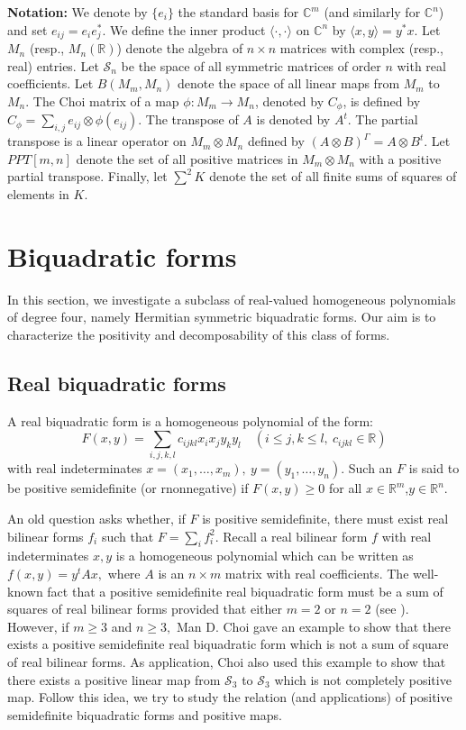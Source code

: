 \documentclass[12pt,a4paper]{amsart}
\theoremstyle{plain}
\theoremstyle{remark}
\theoremstyle{definition}
\def \R {\mathbb{R}}
\def \C {\mathbb{C}}
\def \cS {\mathcal{S}}
\begin{document}
\textbf{Notation:} We denote by $\{e_i\}$ the standard basis for $\C^m$ (and similarly for $\C^n$) and set $e_{ij} = e_i e_j^*$. We define the inner product $\langle \cdot , \cdot \rangle$ on $\C^n$ by $\langle x,y\rangle = y^*x$. Let $M_n$ (resp., $M_n(\R)$) denote the algebra of $n\times n$ matrices with complex (resp., real) entries. Let $\cS_n$ be the space of all symmetric matrices of order $n$ with real coefficients. Let $B(M_m, M_n)$ denote the space of all linear maps from $M_m$ to $M_n$. The Choi matrix of a map $\phi: M_m \to M_n$, denoted by $C_{\phi}$, is defined by $C_{\phi} = \sum_{i,j}e_{ij} \otimes \phi(e_{ij})$. The transpose of $A$ is denoted by $A^t$. The partial transpose is a linear operator on $M_m\otimes M_n$ defined by $(A \otimes B)^{\Gamma} = A \otimes B^t$. Let $PPT[m,n]$ denote the set of all positive matrices in $M_m\otimes M_n$ with a positive partial transpose. Finally, let $\sum^2 K$ denote the set of all finite sums of squares of elements in $K$.
\section{Biquadratic forms}
In this section, we investigate a subclass of real-valued homogeneous polynomials of degree four, namely Hermitian symmetric biquadratic forms. Our aim is to characterize the positivity and decomposability of this class of forms.

\subsection{Real biquadratic forms}
A real biquadratic form is a homogeneous polynomial of the form:
$$
F(x,y) = \sum_{i,j,k,l} c_{ijkl} x_ix_jy_ky_l \quad  (i \le j, k\le l, \ c_{ijkl} \in \R) 
$$
with real indeterminates $x=(x_1,\ldots, x_m), \ y = ( y_1, \ldots, y_n).$ Such an $F$ is said to be positive semidefinite (or rnonnegative) if $F(x,y) \ge 0$ for all $x\in \R^m$,$y\in \R^n.$ 

An old question asks whether, if $F$ is positive semidefinite, there must exist real bilinear forms $f_i$ such that $F = \sum_{i} f_i^2$. Recall a real bilinear form $f$ with real indeterminates $x,y$ is a homogeneous polynomial which can be written as $f(x,y) = y^tAx,$ where $A$ is an $n\times m$ matrix with real coefficients.
The well-known fact that a positive semidefinite real biquadratic form must be a sum of squares of real bilinear forms provided that either $m=2$ or $n=2$ (see \cite[Theorem 1]{Calderon}). However, if $m\ge 3$ and $n\ge 3,$ Man D. Choi \cite{Choi75a} gave an example to show that there exists a positive semidefinite real biquadratic form which is not a sum of square of real bilinear forms.
As application, Choi also used this example to show that there exists a positive linear map from $\cS_3$ to $\cS_3$ which is not completely positive map. Follow this idea, we try to study the relation (and applications) of positive semidefinite biquadratic forms and positive maps.
\end{document}
